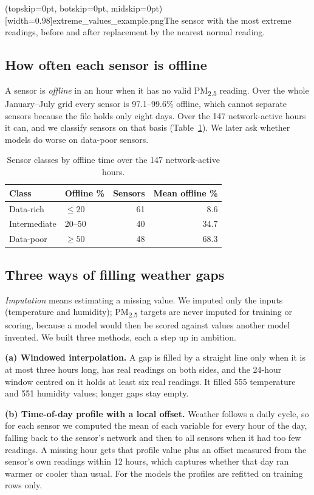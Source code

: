 \documentclass{ieeeaccess}
\newcommand{\pmtwo}{PM\textsubscript{2.5}}
\begin{document}
\Figure[t!](topskip=0pt, botskip=0pt, midskip=0pt)[width=0.98\columnwidth]{extreme_values_example.png}{The sensor with the most extreme readings, before and after replacement by the nearest normal reading.\label{fig:extreme}}

\subsection{How often each sensor is offline}
A sensor is \emph{offline} in an hour when it has no valid \pmtwo{} reading. Over the whole January--July grid every sensor is 97.1--99.6\% offline, which cannot separate sensors because the file holds only eight days. Over the 147 network-active hours it can, and we classify sensors on that basis (Table~\ref{tab:offline}). We later ask whether models do worse on data-poor sensors.

\begin{table}[t]
\caption{Sensor classes by offline time over the 147 network-active hours.}
\label{tab:offline}
\centering
\begin{tabular}{llrr}
\toprule
Class & Offline \% & Sensors & Mean offline \% \\
\midrule
Data-rich & $\le 20$ & 61 & 8.6 \\
Intermediate & 20--50 & 40 & 34.7 \\
Data-poor & $\ge 50$ & 48 & 68.3 \\
\bottomrule
\end{tabular}
\end{table}

\subsection{Three ways of filling weather gaps}
\label{sec:imputers}
\emph{Imputation} means estimating a missing value. We imputed only the inputs (temperature and humidity); \pmtwo{} targets are never imputed for training or scoring, because a model would then be scored against values another model invented. We built three methods, each a step up in ambition.

\textbf{(a) Windowed interpolation.} A gap is filled by a straight line only when it is at most three hours long, has real readings on both sides, and the 24-hour window centred on it holds at least six real readings. It filled 555 temperature and 551 humidity values; longer gaps stay empty.

\textbf{(b) Time-of-day profile with a local offset.} Weather follows a daily cycle, so for each sensor we computed the mean of each variable for every hour of the day, falling back to the sensor's network and then to all sensors when it had too few readings. A missing hour gets that profile value plus an offset measured from the sensor's own readings within 12 hours, which captures whether that day ran warmer or cooler than usual. For the models the profiles are refitted on training rows only.
\end{document}
